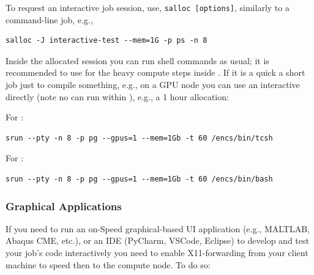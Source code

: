 To request an interactive job 
session, use, \texttt{salloc [options]}, similarly to a 
 command-line job, e.g.,
%
\begin{verbatim}
salloc -J interactive-test --mem=1G -p ps -n 8
\end{verbatim}
%
%
Inside the allocated  session you can run shell
commands as usual; it is recommended to use  for
the heavy compute steps inside .
%
If it is a quick a short job just to compile something, e.g., on
a GPU node you can use an interactive  directly
(note no  can run within ), e.g., a 1 hour
allocation:

For :
\begin{verbatim}
srun --pty -n 8 -p pg --gpus=1 --mem=1Gb -t 60 /encs/bin/tcsh
\end{verbatim}

For :
\begin{verbatim}
srun --pty -n 8 -p pg --gpus=1 --mem=1Gb -t 60 /encs/bin/bash
\end{verbatim}

\subsubsection{Graphical Applications}

If you need to run an on-Speed graphical-based UI application (e.g., MALTLAB,
Abaqus CME, etc.), or an IDE (PyCharm, VSCode, Eclipse)
to develop and test your job's code interactively you need to enable
X11-forwarding from your client machine to speed then to the compute node.
To do so:

